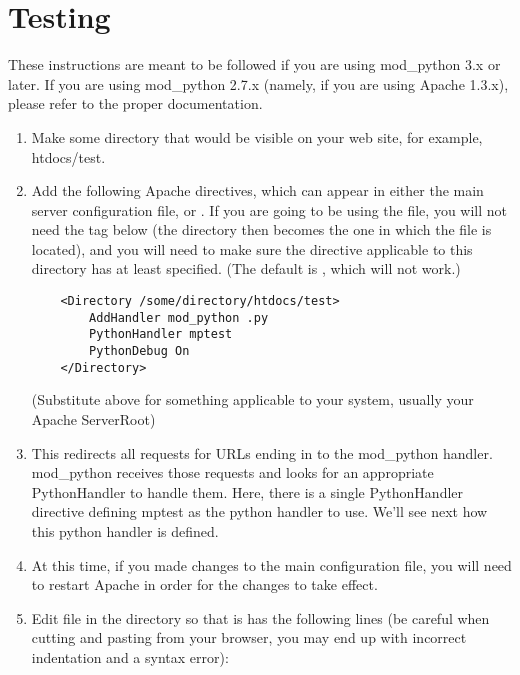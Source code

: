 \section{Testing\label{inst-testing}}

 These instructions are meant to be followed if you are
using mod_python 3.x or later. If you are using mod_python 2.7.x (namely,
if you are using Apache 1.3.x), please refer to the proper documentation.

\begin{enumerate}

\item
  Make some directory that would be visible on your web site, for
  example, htdocs/test.

\item
  Add the following Apache directives, which can appear in either the
  main server configuration file, or .  If you are
  going to be using the  file, you will not need the
   tag below (the directory then becomes the one in
  which the  file is located), and you will need to
  make sure the  directive applicable to this
  directory has at least  specified. (The default is
  , which will not work.)  

  \begin{verbatim}
    <Directory /some/directory/htdocs/test> 
        AddHandler mod_python .py
        PythonHandler mptest 
        PythonDebug On 
    </Directory>
  \end{verbatim}

  (Substitute  above for something applicable to
  your system, usually your Apache ServerRoot)

\item
  This redirects all requests for URLs ending in  to the mod_python
  handler. mod_python receives those requests and looks for an appropriate
  PythonHandler to handle them. Here, there is a single PythonHandler
  directive defining mptest as the python handler to use. We'll see next
  how this python handler is defined.

\item
  At this time, if you made changes to the main configuration file, you
  will need to restart Apache in order for the changes to take effect.

\item
  Edit  file in the  directory so
  that is has the following lines (be careful when cutting and pasting
  from your browser, you may end up with incorrect indentation and a
  syntax error):


\end{enumerate}
